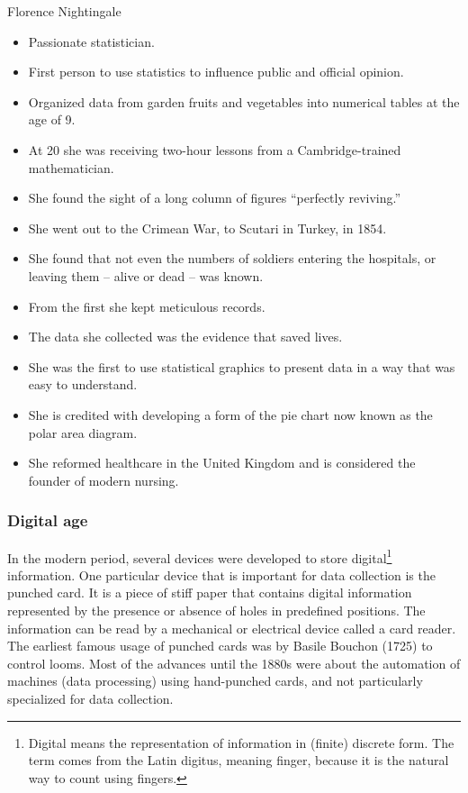 \begin{slidebox}{Florence Nightingale}{}
  \begin{itemize}
    \item Passionate statistician.
    \item First person to use statistics to influence public and official opinion.
    \item Organized data from garden fruits and vegetables into numerical tables at the age of 9.
    \item At 20 she was receiving two-hour lessons from a Cambridge-trained mathematician.
    \item She found the sight of a long column of figures ``perfectly reviving.''
    \item She went out to the Crimean War, to Scutari in Turkey, in 1854.
    \item She found that not even the numbers of soldiers entering the hospitals, or leaving them – alive or dead – was known.
    \item From the first she kept meticulous records.
    \item The data she collected was the evidence that saved lives.
    \item She was the first to use statistical graphics to present data in a way that was easy to understand.
    \item She is credited with developing a form of the pie chart now known as the polar area diagram.
    \item She reformed healthcare in the United Kingdom and is considered the founder of modern nursing.
  \end{itemize}
\end{slidebox}

\subsubsection{Digital age}

In the modern period, several devices were developed to store digital\footnote{Digital
means the representation of information in (finite) discrete form.  The term comes from the Latin
digitus, meaning finger, because it is the natural way to count using fingers.}
information.  One particular device that is important for data collection is the punched
card.  It is a piece of stiff paper that contains digital information represented by the
presence or absence of holes in predefined positions.  The information can be read by a
mechanical or electrical device called a card reader.  The earliest famous usage of
punched cards was by Basile Bouchon (1725) to control looms.  Most of the advances until
the 1880s were about the automation of machines (data processing) using hand-punched cards, and not
particularly specialized for data collection.

